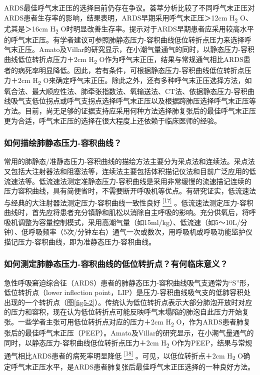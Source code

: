 ARDS最佳呼气末正压的选择目前仍存在争议。荟萃分析比较了不同呼气末正压对ARDS患者生存率的影响，结果表明，ARDS早期采用呼气末正压＞12cm
H\textsubscript{2} O、尤其是＞16cm H\textsubscript{2}
O时明显改善生存率。提示对于ARDS早期患者应采用较高水平的呼气末正压。有学者建议可参照肺静态压力-容积曲线低位转折点压力来选择呼气末正压。Amato及Villar的研究显示，在小潮气量通气的同时，以静态压力-容积曲线低位转折点压力＋2cm
H\textsubscript{2}
O作为呼气末正压，结果与常规通气相比ARDS患者的病死率明显降低。因此，若有条件，可根据静态压力-容积曲线低位转折点压力＋2cm
H\textsubscript{2}
O来确定呼气末正压。除此之外，还有多种呼气末正压选择方法，如氧合法、最大顺应性法、肺牵张指数法、氧输送法、CT法、依据静态压力-容积曲线吸气支低位拐点或呼气支拐点选择呼气末正压以及根据跨肺压选择呼气末正压等方法。目前，尚无足够的证据支持应采用何种方法选择肺复张后的最佳呼气末正压更为合适，呼气末正压的选择在很大程度上还依赖于临床医师的经验。

\subsubsection{如何描绘肺静态压力-容积曲线？}

常用的肺静态/准静态压力-容积曲线的描绘方法主要分为采点法和连续法。采点法又包括大注射器法和阻塞法等，连续法主要包括体积描记仪法和目前广泛应用的低流速法等。低流速法测定准静态压力-容积曲线是采用非常缓慢的流速描记连续的压力容积曲线，具有简便省时，不需要断开呼吸机等优点。有研究证实，低流速法与经典的大注射器法测定压力-容积曲线一致性良好
\protect\hyperlink{text00011.htmlux5cux23ch17-10}{\textsuperscript{{[}17{]}}}
。低流速法测定压力-容积曲线时，首先应将患者充分镇静和肌松以消除自主呼吸的影响。充分供氧后，将呼吸机调整为容量控制模式，采用高潮气量（如15ml/kg）、低流速（如5～10L/分钟）、低呼吸频率（5次/分钟左右）通气一次或数次，用呼吸机或呼吸功能监护仪描记压力-容积曲线，即为准静态压力-容积曲线。

\subsubsection{如何测定肺静态压力-容积曲线的低位转折点？有何临床意义？}

急性呼吸窘迫综合征（ARDS）患者的肺静态压力-容积曲线吸气支通常为“S”形，低位转折点（lower
inflection
point，LIP）是压力-容积曲线吸气支的低肺容积处出现的一个转折点（图\ref{fig5-2}）。传统认为低位转折点表示大部分肺泡开放时对应的压力和容积，现在认为低位转折点可能反映呼气末塌陷的肺泡自此压力开始复张。一些学者主张可用低位转折点对应的压力＋2cm
H\textsubscript{2}
O，作为ARDS患者肺复张后的最佳呼气末正压（PEEP）。Amato及Villar的研究显示，在小潮气量通气的同时，以静态压力-容积曲线低位转折点压力＋2cm
H\textsubscript{2} O作为PEEP，结果与常规通气相比ARDS患者的病死率明显降低
\protect\hyperlink{text00011.htmlux5cux23ch18-10}{\textsuperscript{{[}18{]}}}
。可见，以低位转折点＋2cm H\textsubscript{2}
O确定呼气末正压水平，是ARDS患者肺复张后最佳呼气末正压选择的一种良好方法。

